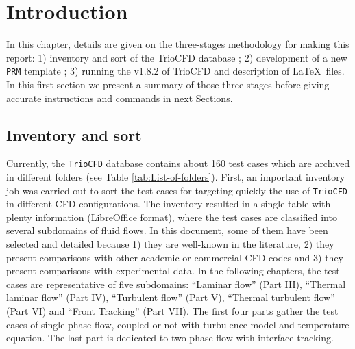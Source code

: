 \chapter{Introduction}

In this chapter, details are given on the three-stages methodology
for making this report: 1) inventory and sort of the \textsf{TrioCFD}
database ; 2) development of a new \texttt{PRM} template ; 3) running
the \textsf{v1.8.2} of \textsf{TrioCFD} and description of \LaTeX~files.
In this first section we present a summary of those three stages before
giving accurate instructions and commands in next Sections.

\section{Inventory and sort}
Currently, the \texttt{TrioCFD} database contains about 160 test cases
which are archived in different folders (see Table \ref{tab:List-of-folders}).
First, an important inventory job was carried out to sort the test
cases for targeting quickly the use of \texttt{TrioCFD} in different
CFD configurations. The inventory resulted in a single table with
plenty information (LibreOffice format), where the test cases are
classified into several subdomains of fluid flows. In this document,
some of them have been selected and detailed because 1) they are well-known
in the literature, 2) they present comparisons with other academic
or commercial CFD codes and 3) they present comparisons with experimental
data. In the following chapters, the test cases are representative
of five subdomains: ``Laminar flow'' (Part III), ``Thermal laminar
flow'' (Part IV), ``Turbulent flow'' (Part V), ``Thermal turbulent
flow'' (Part VI) and ``Front Tracking'' (Part VII). The first four
parts gather the test cases of single phase flow, coupled or not with
turbulence model and temperature equation. The last part is dedicated
to two-phase flow with interface tracking.

